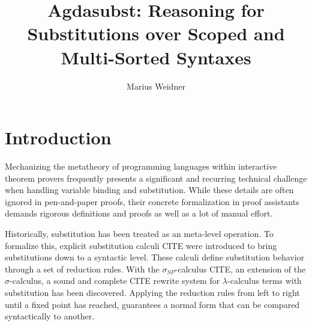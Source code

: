 \documentclass[screen,nonacm]{acmart}
\begin{document}
\title{Agdasubst: Reasoning for Substitutions over Scoped and Multi-Sorted Syntaxes}

\author{Marius Weidner}

\begin{abstract}

\end{abstract}

\maketitle

\section{Introduction}\label{sec:introduction}

Mechanizing the metatheory of programming languages within interactive theorem
provers frequently presents a significant and recurring technical challenge
when handling variable binding and substitution. While these details are often
ignored in pen-and-paper proofs, their concrete formalization in proof
assistants demands rigorous definitions and proofs as well as a lot of manual
effort.

Historically, substitution has been treated as an meta-level operation. To
formalize this, explicit substitution calculi CITE were introduced to bring
substitutions down to a syntactic level. These calculi define substitution
behavior through a set of reduction rules. With the $σ_{SP}$-calculus CITE, an
extension of the $σ$-calculus, a sound and complete CITE rewrite system for
$λ$-calculus terms with substitution has been discovered. Applying the
reduction rules from left to right until a fixed point has reached, guarantees
a normal form that can be compared syntactically to another.
\end{document}

